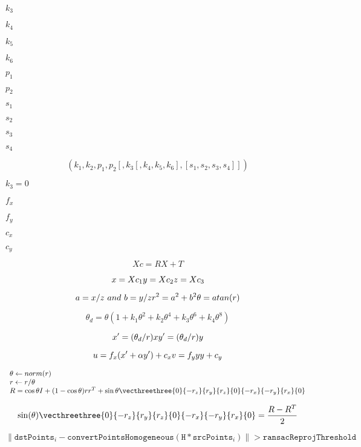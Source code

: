 \documentclass{article}
\begin{document}
$k_3$
\pagebreak

$k_4$
\pagebreak

$k_5$
\pagebreak

$k_6$
\pagebreak

$p_1$
\pagebreak

$p_2$
\pagebreak

$s_1$
\pagebreak

$s_2$
\pagebreak

$s_3$
\pagebreak

$s_4$
\pagebreak

\[(k_1, k_2, p_1, p_2[, k_3[, k_4, k_5, k_6],[s_1, s_2, s_3, s_4]])\]
\pagebreak

$k_3=0$
\pagebreak

$f_x$
\pagebreak

$f_y$
\pagebreak

$c_x$
\pagebreak

$c_y$
\pagebreak

\[Xc = R X + T\]
\pagebreak

\[x = Xc_1 \\ y = Xc_2 \\ z = Xc_3\]
\pagebreak

\[a = x / z \ and \ b = y / z \\ r^2 = a^2 + b^2 \\ \theta = atan(r)\]
\pagebreak

\[\theta_d = \theta (1 + k_1 \theta^2 + k_2 \theta^4 + k_3 \theta^6 + k_4 \theta^8)\]
\pagebreak

\[x' = (\theta_d / r) x \\ y' = (\theta_d / r) y \]
\pagebreak

\[u = f_x (x' + \alpha y') + c_x \\
    v = f_y yy + c_y\]
\pagebreak

\[\begin{array}{l} \theta \leftarrow norm(r) \\ r  \leftarrow r/ \theta \\ R =  \cos{\theta} I + (1- \cos{\theta} ) r r^T +  \sin{\theta} \vecthreethree{0}{-r_z}{r_y}{r_z}{0}{-r_x}{-r_y}{r_x}{0} \end{array}\]
\pagebreak

\[\sin ( \theta ) \vecthreethree{0}{-r_z}{r_y}{r_z}{0}{-r_x}{-r_y}{r_x}{0} = \frac{R - R^T}{2}\]
\pagebreak

\[\| \texttt{dstPoints} _i -  \texttt{convertPointsHomogeneous} ( \texttt{H} * \texttt{srcPoints} _i) \|  >  \texttt{ransacReprojThreshold}\]
\pagebreak
\end{document}
